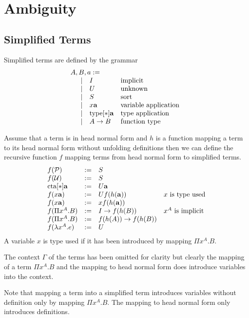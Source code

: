 \section{Ambiguity}




\subsection{Simplified Terms}

Simplified terms are defined by the grammar
$$
\begin{array}{lllll} 
    A, B, a :=
    \\
    \quad
    \begin{array}{lllll} 
        \mid & I &\text{implicit}
        \\
        \mid&
        U &\text{unknown}
        \\
        \mid&
        S &\text{sort}
        \\
        \mid&
        x {\mathbf a} &\text{variable application}
        \\
        \mid&
        {\text{type}}[*] {\mathbf a} &\text{type application}
        \\
        \mid&
        A \to B &\text{function type}
     \end{array}
 \end{array}
$$

Assume that a term is in head normal form and $h$ is a function mapping a term
to its head normal form without unfolding definitions then we can define the
recursive function $f$ mapping terms from head normal form to simplified terms.
$$
\begin{array}{lllll} 
    f({\cal P}) &:=& S
    \\
    f({\cal U})  &:=& S
    \\
    {\text{cta}}[*] {\mathbf a} &:=& U {\mathbf a}
    \\
    f(x {\mathbf a})  &:=& U f(h({\mathbf a}))
    &\text{$x$ is type used}
    \\
    f(x {\mathbf a})  &:=& x f(h({\mathbf a}))
    \\
    f(\Pi x^A.B) &:=& I \to f(h(B)) & \text{$x^A$ is implicit}
    \\
    f(\Pi x^A.B)
    &:=&
    f(h(A)) \to f(h(B))
    \\
    f(\lambda x^A.e) &:=& U
 \end{array}
$$
A variable $x$ is type used if it has been introduced by mapping $\Pi x^A.B$.

The context $\Gamma$ of the terms has been omitted for clarity but clearly the
mapping of a term $\Pi x^A.B$ and the mapping to head normal form does introduce
variables into the context.

Note that mapping a term into a simplified term introduces variables without
definition only by mapping $\Pi x^A.B$. The mapping to head normal form only
introduces definitions.

